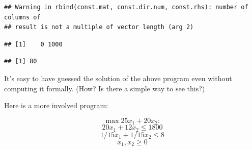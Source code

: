 \documentclass[11pt,]{article}
\newenvironment{Shaded}{\begin{snugshade}}{\end{snugshade}}
\newcommand{\KeywordTok}[1]{\textcolor[rgb]{0.13,0.29,0.53}{\textbf{#1}}}
\newcommand{\DataTypeTok}[1]{\textcolor[rgb]{0.13,0.29,0.53}{#1}}
\newcommand{\DecValTok}[1]{\textcolor[rgb]{0.00,0.00,0.81}{#1}}
\newcommand{\StringTok}[1]{\textcolor[rgb]{0.31,0.60,0.02}{#1}}
\newcommand{\OperatorTok}[1]{\textcolor[rgb]{0.81,0.36,0.00}{\textbf{#1}}}
\newcommand{\NormalTok}[1]{#1}
\begin{document}
\begin{verbatim}
## Warning in rbind(const.mat, const.dir.num, const.rhs): number of columns of
## result is not a multiple of vector length (arg 2)
\end{verbatim}

\begin{Shaded}
\end{Shaded}

\begin{verbatim}
## [1]    0 1000
\end{verbatim}

\begin{Shaded}
\end{Shaded}

\begin{verbatim}
## [1] 80
\end{verbatim}

It's easy to have guessed the solution of the above program even without
computing it formally. (How? Is there a simple way to see this?)

Here is a more involved program:

\[\max{} 25x_1+20x_2: \] \[20x_1+12x_2\leq 1800\]
\[1/15x_1+1/15x_2\leq 8\] \[x_1,x_2\geq 0\]

\begin{Shaded}
\end{Shaded}
\end{document}
